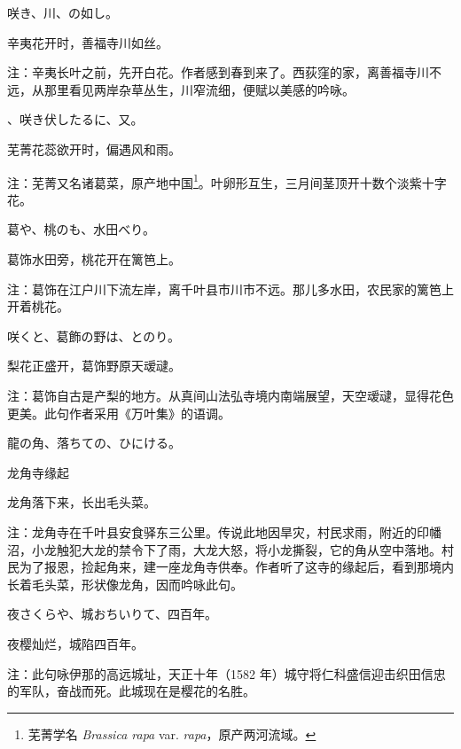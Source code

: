 \begin{haiku}
    {\FH {}咲き、川、の如し。}

    {\FK 辛夷花开时，善福寺川如丝。}

    {\FT 注：辛夷长叶之前，先开白花。作者感到春到来了。西荻窪的家，离善福寺川不远，从那里看见两岸杂草丛生，川窄流细，便赋以美感的吟咏。}
\end{haiku}

\begin{haiku}
    {\FH {}、咲き伏したるに、又。}

    {\FK 芜菁花蕊欲开时，偏遇风和雨。}

    {\FT 注：芜菁又名诸葛菜，原产地中国\footnote{{\FT 芜菁学名} \emph{Brassica rapa} var. \emph{rapa}{\FT，原产两河流域。}}。叶卵形互生，三月间茎顶开十数个淡紫十字花。}
\end{haiku}

\begin{haiku}
    {\FH 葛や、桃のも、水田べり。}

    {\FK 葛饰水田旁，桃花开在篱笆上。}

    {\FT 注：葛饰在江户川下流左岸，离千叶县市川市不远。那儿多水田，农民家的篱笆上开着桃花。}
\end{haiku}

\begin{haiku}
    {\FH {}咲くと、葛飾の野は、とのり。}

    {\FK 梨花正盛开，葛饰野原天叆叇。}

    {\FT 注：葛饰自古是产梨的地方。从真间山法弘寺境内南端展望，天空叆叇，显得花色更美。此句作者采用《万叶集》的语调。}
\end{haiku}

\begin{haiku}
    {\FH 龍の角、落ちての、ひにける。}

    {\FK 龙角寺缘起}

    {\FK 龙角落下来，长出毛头菜。}

    {\FT 注：龙角寺在千叶县安食驿东三公里。传说此地因旱灾，村民求雨，附近的印幡沼，小龙触犯大龙的禁令下了雨，大龙大怒，将小龙撕裂，它的角从空中落地。村民为了报恩，捡起角来，建一座龙角寺供奉。作者听了这寺的缘起后，看到那境内长着毛头菜，形状像龙角，因而吟咏此句。}
\end{haiku}

\begin{haiku}
    {\FH 夜さくらや、城おちいりて、四百年。}

    {\FK 夜樱灿烂，城陷四百年。}

    {\FT 注：此句咏伊那的高远城址，天正十年（1582 年）城守将仁科盛信迎击织田信忠的军队，奋战而死。此城现在是樱花的名胜。}
\end{haiku}

